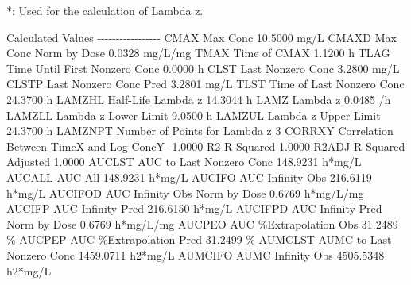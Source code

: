 \documentclass[
  12pt,
]{krantz}
\newenvironment{Shaded}{\begin{snugshade}}{\end{snugshade}}
\newcommand{\ExtensionTok}[1]{#1}
\newcommand{\NormalTok}[1]{#1}
\begin{document}
\begin{Shaded}
\begin{Highlighting}[]
\ExtensionTok{*}\NormalTok{: Used for the calculation of Lambda z.}


\ExtensionTok{Calculated}\NormalTok{ Values}
\ExtensionTok{{-}{-}{-}{-}{-}{-}{-}{-}{-}{-}{-}{-}{-}{-}{-}{-}{-}}
\ExtensionTok{CMAX}\NormalTok{       Max Conc                                       10.5000 mg/L}
\ExtensionTok{CMAXD}\NormalTok{      Max Conc Norm by Dose                           0.0328 mg/L/mg}
\ExtensionTok{TMAX}\NormalTok{       Time of CMAX                                    1.1200 h}
\ExtensionTok{TLAG}\NormalTok{       Time Until First Nonzero Conc                   0.0000 h}
\ExtensionTok{CLST}\NormalTok{       Last Nonzero Conc                               3.2800 mg/L}
\ExtensionTok{CLSTP}\NormalTok{      Last Nonzero Conc Pred                          3.2801 mg/L}
\ExtensionTok{TLST}\NormalTok{       Time of Last Nonzero Conc                      24.3700 h}
\ExtensionTok{LAMZHL}\NormalTok{     Half{-}Life Lambda z                             14.3044 h}
\ExtensionTok{LAMZ}\NormalTok{       Lambda z                                        0.0485 /h}
\ExtensionTok{LAMZLL}\NormalTok{     Lambda z Lower Limit                            9.0500 h}
\ExtensionTok{LAMZUL}\NormalTok{     Lambda z Upper Limit                           24.3700 h}
\ExtensionTok{LAMZNPT}\NormalTok{    Number of Points for Lambda z                   3}
\ExtensionTok{CORRXY}\NormalTok{     Correlation Between TimeX and Log ConcY        {-}1.0000 }
\ExtensionTok{R2}\NormalTok{         R Squared                                       1.0000 }
\ExtensionTok{R2ADJ}\NormalTok{      R Squared Adjusted                              1.0000 }
\ExtensionTok{AUCLST}\NormalTok{     AUC to Last Nonzero Conc                      148.9231 h*mg/L}
\ExtensionTok{AUCALL}\NormalTok{     AUC All                                       148.9231 h*mg/L}
\ExtensionTok{AUCIFO}\NormalTok{     AUC Infinity Obs                              216.6119 h*mg/L}
\ExtensionTok{AUCIFOD}\NormalTok{    AUC Infinity Obs Norm by Dose                   0.6769 h*mg/L/mg}
\ExtensionTok{AUCIFP}\NormalTok{     AUC Infinity Pred                             216.6150 h*mg/L}
\ExtensionTok{AUCIFPD}\NormalTok{    AUC Infinity Pred Norm by Dose                  0.6769 h*mg/L/mg}
\ExtensionTok{AUCPEO}\NormalTok{     AUC \%Extrapolation Obs                         31.2489 \%}
\ExtensionTok{AUCPEP}\NormalTok{     AUC \%Extrapolation Pred                        31.2499 \%}
\ExtensionTok{AUMCLST}\NormalTok{    AUMC to Last Nonzero Conc                    1459.0711 h2*mg/L}
\ExtensionTok{AUMCIFO}\NormalTok{    AUMC Infinity Obs                            4505.5348 h2*mg/L}

\end{Highlighting}
\end{Shaded}
\end{document}
